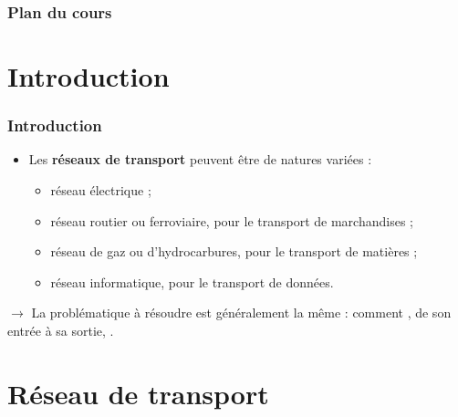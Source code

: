 \documentclass[french,10pt,t,handout]{beamer}
\begin{document}
 \begin{frame}[t]
   \frametitle{Plan du cours}
   \vspace{-0.3cm}

   \tableofcontents[hideallsubsections]
 \end{frame}





\section{Introduction}

\begin{frame} 
	\frametitle{Introduction}
	
	\begin{itemize}
		\item Les \textbf{r\'eseaux de transport} peuvent \^etre de natures vari\'ees :
			\begin{itemize}
				\item r\'eseau \'electrique ; 
				\item r\'eseau routier ou ferroviaire, pour le transport de marchandises ;
				\item r\'eseau de gaz ou d'hydrocarbures, pour le transport de mati\`eres ;
				\item r\'eseau informatique, pour le transport de donn\'ees.
			\end{itemize}
	\end{itemize}

	\vspace{1cm}
	$\rightarrow$ La probl\'ematique \`a r\'esoudre est g\'en\'eralement la
				  m\^eme : comment ,
				  de son entr\'ee \`a sa sortie, .
\end{frame}



\section{R\'eseau de transport}
\end{document}

